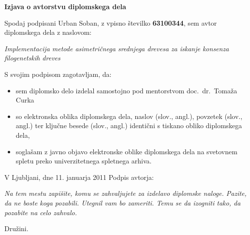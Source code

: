 \documentclass[a4paper, 12pt]{book}
\newcommand{\clearemptydoublepage}{\newpage{\pagestyle{empty}\cleardoublepage}}
\begin{document}
\vspace{2cm}

\clearemptydoublepage

\vspace*{1cm}
\begin{center}
{\Large \textbf{\sc Izjava o avtorstvu diplomskega dela}}
\end{center}

\vspace{1cm}
\noindent Spodaj podpisani Urban Soban,
z vpisno številko \textbf{63100344}, sem avtor  diplomskega dela z naslovom:

\vspace{0.5cm}
\emph{Implementacija metode asimetričnega srednjega drevesa za iskanje konsenza filogenetskih dreves}

\vspace{1.5cm}
\noindent S svojim podpisom zagotavljam, da:
\begin{itemize}
	\item sem diplomsko delo izdelal samostojno pod mentorstvom
		doc.\ dr.\ Tomaža Curka

	\item	so elektronska oblika diplomskega dela, naslov (slov., angl.), povzetek (slov., angl.) ter ključne besede (slov., angl.) identični s tiskano obliko diplomskega dela,
	\item soglašam z javno objavo elektronske oblike diplomskega dela na svetovnem spletu preko univerzitetnega spletnega arhiva.	
\end{itemize}

\vspace{1cm}
\noindent V Ljubljani, dne 11. januarja 2011 \hfill Podpis avtorja:

\clearemptydoublepage

\thispagestyle{empty}\mbox{}\vfill\null\it%
Na tem mestu zapišite, komu se zahvaljujete za izdelavo diplomske naloge. Pazite, da 
ne boste koga pozabili. Utegnil vam bo zameriti. Temu se da izogniti tako, da 
pozabite na celo zahvalo.
\rm\normalfont

\clearemptydoublepage

\thispagestyle{empty}\mbox{}{\textheight}\mbox{}\hfill\begin{minipage}{0.55\textwidth}%
Družini.
\normalfont\end{minipage}
\end{document}
